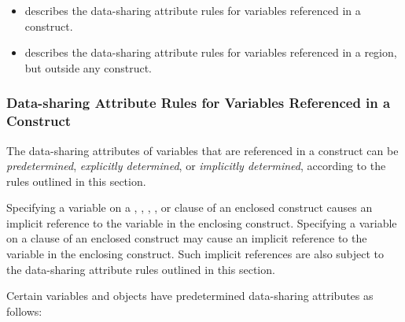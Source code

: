 \begin{itemize}
\item {} 
describes the data-sharing attribute rules for variables 
referenced in a construct.

\item {} describes the data-sharing attribute rules for variables 
referenced in a region, but outside any construct. 
\end{itemize}









\subsubsection{Data-sharing Attribute Rules for Variables Referenced in a Construct}
\label{subsubsec:Data-sharing Attribute Rules for Variables Referenced in a Construct}
The data-sharing attributes of variables that are referenced in a construct can be 
\emph{predetermined}, \emph{explicitly determined}, or \emph{implicitly determined}, according to the rules 
outlined in this section.

Specifying a variable on a , , , , 
or  clause of an enclosed construct causes an implicit reference to the 
variable in the enclosing construct. Specifying a variable on a  clause of an enclosed 
construct may cause an implicit reference to the variable in the enclosing construct. 
Such implicit references are also subject to the data-sharing attribute rules outlined in 
this section.

Certain variables and objects have predetermined data-sharing attributes as follows:

